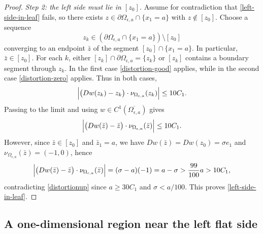 \documentclass[reqno,11pt]{amsart}
\numberwithin{equation}{section}
\theoremstyle{remark}
\begin{document}
\begin{proof}
\smallskip
\noindent\emph{Step 2: the left side must lie in $[z_0]$.}
Assume for contradiction that \eqref{left-side-in-leaf} fails, so there exists
$z\in\partial\Omega_{\epsilon,a}\cap\{x_1=a\}$ with $z\notin[z_0]$.
Choose a sequence
\[
z_k\in(\partial\Omega_{\epsilon,a}\cap\{x_1=a\})\setminus[z_0]
\]
converging to an endpoint $\bar z$ of the segment $[z_0]\cap\{x_1=a\}$.
In particular, $\bar z\in[z_0]$.
For each $k$, either $[z_k]\cap\partial\Omega_{\epsilon,a}=\{z_k\}$ or $[z_k]$ contains a boundary segment through $z_k$.
In the first case \eqref{distortion-good} applies, while in the second case \eqref{distortion-zero} applies.
Thus in both cases,
\[
\Bigl|\bigl(Dw(z_k)-z_k\bigr)\cdot \nu_{\Omega_{\epsilon,a}}(z_k)\Bigr|\le 10C_1.
\]
Passing to the limit and using $w\in C^1(\overline{\Omega_{\epsilon,a}})$ gives
\begin{equation}\label{distortionup}
\Bigl|\bigl(Dw(\bar z)-\bar z\bigr)\cdot \nu_{\Omega_{\epsilon,a}}(\bar z)\Bigr|\le 10C_1.
\end{equation}
However, since $\bar z\in[z_0]$ and $\bar z_1=a$, we have $Dw(\bar z)=Dw(z_0)=\sigma e_1$ and
$\nu_{\Omega_{\epsilon,a}}(\bar z)=(-1,0)$, hence
\[
\Bigl|\bigl(Dw(\bar z)-\bar z\bigr)\cdot \nu_{\Omega_{\epsilon,a}}(\bar z)\Bigr|
=
(\sigma-a)(-1)
=a-\sigma
>\frac{99}{100}a
>10C_1,
\]
contradicting \eqref{distortionup} since $a\ge 30C_1$ and $\sigma<a/100$.
This proves \eqref{left-side-in-leaf}.
\end{proof}

\subsection{A one-dimensional region near the left flat side}
\end{document}
